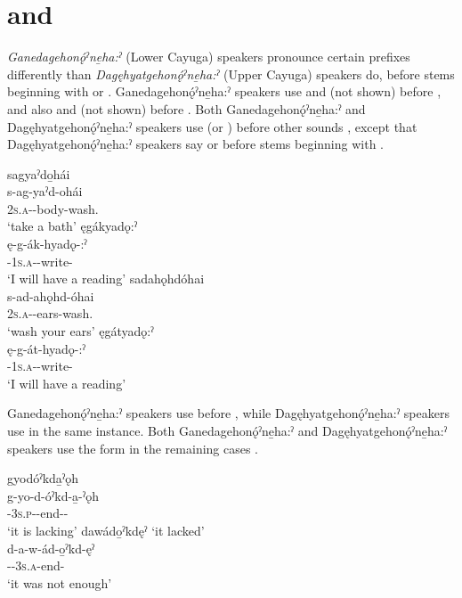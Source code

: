 \section{ and } \label{DY/GY and TY/KY}
\textit{Ganedagehonǫ́ˀne̱ha:ˀ} (Lower Cayuga) speakers pronounce certain prefixes differently than \textit{Dagęhyatgehonǫ́ˀne̱ha:ˀ} (Upper Cayuga) speakers do, before stems beginning with  or . Ganedagehonǫ́ˀne̱ha:ˀ speakers use  \textsc{\semireflexive}  and  \textsc{} (not shown) before , and also   and  (not shown) before . Both Ganedagehonǫ́ˀne̱ha:ˀ and Dagęhyatgehonǫ́ˀne̱ha:ˀ speakers use  (or ) before other sounds , except that Dagęhyatgehonǫ́ˀne̱ha:ˀ speakers say  or  before stems beginning with  .

\ea\label{ex:gyex}
\ea sagyaˀdo̱hái\\\label{ex:gyexa}
\gll s-ag-yaˀd-ohái\\
 \textsc{2s.a}-{\semireflexive}-body-wash.{\noaspect} \\
\glt `take a bath'
\ex ęgákyadǫ:ˀ\\\label{ex:gyexb}
\gll ę-g-ák-hyadǫ-:ˀ\\
 \fut-\textsc{1s.a}-{\semireflexive}-write-{\punctual}\\
\glt `I will have a reading'
\ex sadahǫhdóhai\\\label{ex:gyexc}
\gll s-ad-ahǫhd-óhai\\
 \textsc{2s.a}-{\semireflexive}-ears-wash.{\noaspect}\\
\glt `wash your ears'
\ex ęgátyadǫ:ˀ\\\label{ex:gyexd}
\gll ę-g-át-hyadǫ-:ˀ\\
 \fut-\textsc{1s.a}-{\semireflexive}-write-{\punctual}\\
\glt `I will have a reading'
\z
\z

\begin{sloppypar}
Ganedagehonǫ́ˀne̱ha:ˀ speakers use  \textsc{\cislocative} before  , while Dagęhyatgehonǫ́ˀne̱ha:ˀ speakers use  in the same instance. Both Ganedagehonǫ́ˀne̱ha:ˀ and Dagęhyatgehonǫ́ˀne̱ha:ˀ speakers use the  \cislocative form in the remaining cases .
\end{sloppypar}

\ea\label{ex:gyex3}
\ea gyodóˀkda̱ˀǫh\\\label{ex:gyex3a}
\gll g-yo-d-óˀkd-a̱-ˀǫh\\
 {\cislocative}-\textsc{3s.p}-{\semireflexive}-end-{\joinerA}-{\stative}\\
\glt `it is lacking'
\ex dawádo̱ˀkdęˀ ‘it lacked’\\\label{ex:gyex3b}
\gll d-a-w-ád-o̱ˀkd-ęˀ\\
 {\cislocative}-{\factual}-\textsc{3s.a}-{\semireflexive}end-{\punctual}\\
\glt `it was not enough'
\z
\z

